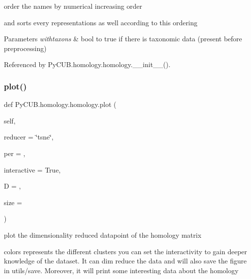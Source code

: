 order the names by numerical increasing order 

and sorts every representations as well according to this ordering


\begin{DoxyParams}{Parameters}
{\em withtaxons} & bool to true if there is taxonomic data (present before preprocessing) \\
\hline
\end{DoxyParams}


Referenced by Py\+C\+U\+B.\+homology.\+homology.\+\_\+\+\_\+init\+\_\+\+\_\+().

\mbox{\label{class_py_c_u_b_1_1homology_1_1homology_a1a3802095c2ea6f426e803b055a2aea9}} 
\subsubsection{\texorpdfstring{plot()}{plot()}}
{\footnotesize\ttfamily def Py\+C\+U\+B.\+homology.\+homology.\+plot (\begin{DoxyParamCaption}\item[{}]{self,  }\item[{}]{reducer = {\ttfamily \char`\"{}tsne\char`\"{}},  }\item[{}]{per = {},  }\item[{}]{interactive = {\ttfamily True},  }\item[{}]{D = {},  }\item[{}]{size = {} }\end{DoxyParamCaption})}



plot the dimensionality reduced datapoint of the homology matrix 

colors represents the different clusters you can set the interactivity to gain deeper knowledge of the dataset. It can dim reduce the data and will also save the figure in utils/save. Moreover, it will print some interesting data about the homology


